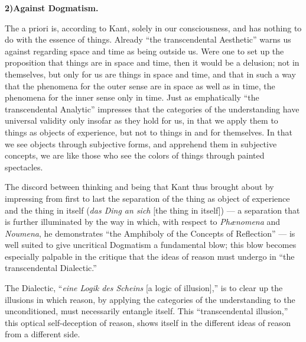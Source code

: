 \documentclass[12pt]{book}
\begin{document}
\begin{center}{\bfseries 2)\quad Against Dogmatism.}\end{center}

The a priori is, according to Kant, solely in our consciousness, and has nothing
to do with the essence of things. Already ``the
transcendental Aesthetic'' warns us against regarding space and time as being
outside us. Were one to set up the proposition that things are in space and time,
then it would be a delusion; not in themselves, but only for us are things in
space and time, and that in such a way that the phenomena for the outer sense are
in space as well as in time, the phenomena for the inner sense only in time. Just
as emphatically ``the transcendental Analytic'' impresses that the categories of
the understanding have universal validity only insofar as they hold for us, in
that we apply them to things as objects of experience, but not to things in and
for themselves. In that we see objects through subjective forms, and apprehend
them in subjective concepts, we are like those who see the colors of things
through painted spectacles.

The discord between thinking and being that Kant thus brought about by impressing
from first to last the separation of the thing as object of experience and the
thing in itself (\textit{das Ding an sich} [the thing in itself]) --- a separation
that is further illuminated by the way in which, with respect to \textit{Phænomena}
and \textit{Noumena}, he demonstrates ``the Amphiboly of the Concepts of
Reflection'' --- is well suited to give uncritical Dogmatism a fundamental blow;
this blow becomes especially palpable in the critique that the ideas of reason
must undergo in ``the transcendental Dialectic.''

The Dialectic, ``\textit{eine Logik des Scheins} [a logic of illusion],'' is to
clear up the illusions in which reason, by applying the categories of the
understanding to the unconditioned, must necessarily entangle itself. This
``transcendental illusion,'' this optical self-deception of reason, shows itself
in the different ideas of reason from a different side.
\end{document}
